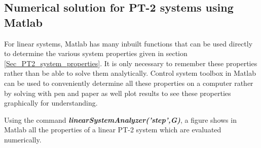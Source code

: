 \subsection{Numerical solution for PT-2 systems using Matlab}

For linear systems, Matlab has many inbuilt functions that can be used directly to determine the various system properties given in section \ref{Sec_PT2_system_properties}. It is only necessary to remember these properties rather than be able to solve them analytically. Control system toolbox in Matlab can be used to conveniently determine all these properties on a computer rather by solving with pen and paper as well plot results to see these properties graphically for understanding.

Using the command \textbf{\textit{linearSystemAnalyzer('step',G)}}, a figure shows in Matlab all the properties of a linear PT-2 system which are evaluated numerically.
